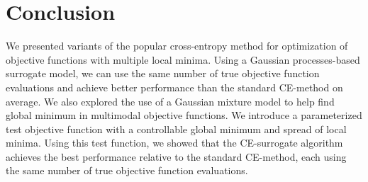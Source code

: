 \section{Conclusion} \label{sec:conclusion}
We presented variants of the popular cross-entropy method for optimization of objective functions with multiple local minima.
Using a Gaussian processes-based surrogate model, we can use the same number of true objective function evaluations and achieve better performance than the standard CE-method on average.
We also explored the use of a Gaussian mixture model to help find global minimum in multimodal objective functions.
We introduce a parameterized test objective function with a controllable global minimum and spread of local minima.
Using this test function, we showed that the CE-surrogate algorithm achieves the best performance relative to the standard CE-method, each using the same number of true objective function evaluations.


